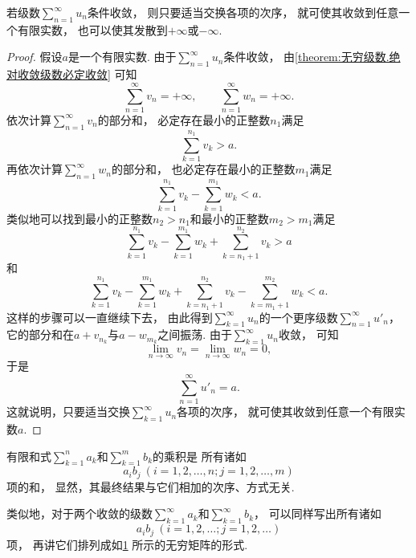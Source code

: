 \begin{theorem}[条件收敛级数的黎曼定理]
若级数\(\sum_{n=1}^\infty u_n\)条件收敛，
则只要适当交换各项的次序，
就可使其收敛到任意一个有限实数，
也可以使其发散到\(+\infty\)或\(-\infty\).
\begin{proof}
假设\(a\)是一个有限实数.
由于\(\sum_{n=1}^\infty u_n\)条件收敛，
由\cref{theorem:无穷级数.绝对收敛级数必定收敛} 可知\[
	\sum_{n=1}^\infty v_n = +\infty,
	\qquad
	\sum_{n=1}^\infty w_n = +\infty.
\]
依次计算\(\sum_{n=1}^\infty v_n\)的部分和，
必定存在最小的正整数\(n_1\)满足\[
	\sum_{k=1}^{n_1} v_k > a.
\]
再依次计算\(\sum_{n=1}^\infty w_n\)的部分和，
也必定存在最小的正整数\(m_1\)满足\[
	\sum_{k=1}^{n_1} v_k
	- \sum_{k=1}^{m_1} w_k
	< a.
\]
类似地可以找到最小的正整数\(n_2>n_1\)和最小的正整数\(m_2>m_1\)满足\[
	\sum_{k=1}^{n_1} v_k
	- \sum_{k=1}^{m_1} w_k
	+ \sum_{k=n_1+1}^{n_2} v_k
	> a
\]和\[
	\sum_{k=1}^{n_1} v_k
	- \sum_{k=1}^{m_1} w_k
	+ \sum_{k=n_1+1}^{n_2} v_k
	- \sum_{k=m_1+1}^{m_2} w_k
	< a.
\]
这样的步骤可以一直继续下去，
由此得到\(\sum_{k=1}^\infty u_n\)的一个更序级数\(\sum_{n=1}^\infty u'_n\)，
它的部分和在\(a + v_{n_k}\)与\(a - w_{m_k}\)之间振荡.
由于\(\sum_{k=1}^\infty u_n\)收敛，
可知\[
	\lim_{n\to\infty} v_n
	= \lim_{n\to\infty} w_n
	= 0,
\]
于是\[
	\sum_{n=1}^\infty u'_n = a.
\]
这就说明，只要适当交换\(\sum_{k=1}^\infty u_n\)各项的次序，
就可使其收敛到任意一个有限实数\(a\).
\end{proof}
\end{theorem}

有限和式\(\sum_{k=1}^n a_k\)和\(\sum_{k=1}^m b_k\)的乘积是
所有诸如\[
	a_i b_j\ (i=1,2,\dotsc,n;j=1,2,\dotsc,m)
\]项的和，
显然，其最终结果与它们相加的次序、方式无关.

类似地，对于两个收敛的级数\(\sum_{k=1}^\infty a_k\)和\(\sum_{k=1}^\infty b_k\)，
可以同样写出所有诸如\[
	a_i b_j\ (i=1,2,\dotsc;j=1,2,\dotsc)
\]项，
再讲它们排列成如\cref{figure:无穷级数.无穷级数乘积各项的矩阵} 所示的无穷矩阵的形式.
\begin{figure}[ht]
	\centering
	\def\term#1#2{\draw({\number#2-1},{1-\number#1})node{$a_#1 b_#2$};}
	\caption{}
	\label{figure:无穷级数.无穷级数乘积各项的矩阵}
\end{figure}

